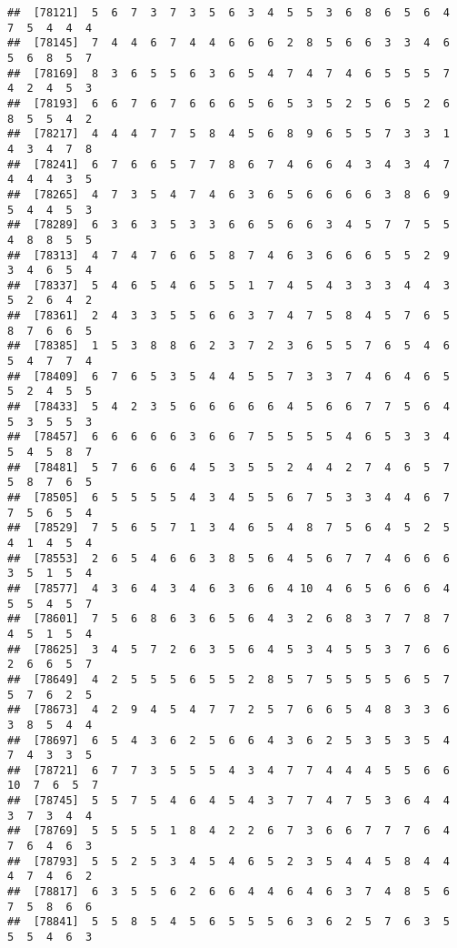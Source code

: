 \documentclass[
]{book}
\begin{document}
\begin{verbatim}
##  [78121]  5  6  7  3  7  3  5  6  3  4  5  5  3  6  8  6  5  6  4  7  5  4  4  4
##  [78145]  7  4  4  6  7  4  4  6  6  6  2  8  5  6  6  3  3  4  6  5  6  8  5  7
##  [78169]  8  3  6  5  5  6  3  6  5  4  7  4  7  4  6  5  5  5  7  4  2  4  5  3
##  [78193]  6  6  7  6  7  6  6  6  5  6  5  3  5  2  5  6  5  2  6  8  5  5  4  2
##  [78217]  4  4  4  7  7  5  8  4  5  6  8  9  6  5  5  7  3  3  1  4  3  4  7  8
##  [78241]  6  7  6  6  5  7  7  8  6  7  4  6  6  4  3  4  3  4  7  4  4  4  3  5
##  [78265]  4  7  3  5  4  7  4  6  3  6  5  6  6  6  6  3  8  6  9  5  4  4  5  3
##  [78289]  6  3  6  3  5  3  3  6  6  5  6  6  3  4  5  7  7  5  5  4  8  8  5  5
##  [78313]  4  7  4  7  6  6  5  8  7  4  6  3  6  6  6  5  5  2  9  3  4  6  5  4
##  [78337]  5  4  6  5  4  6  5  5  1  7  4  5  4  3  3  3  4  4  3  5  2  6  4  2
##  [78361]  2  4  3  3  5  5  6  6  3  7  4  7  5  8  4  5  7  6  5  8  7  6  6  5
##  [78385]  1  5  3  8  8  6  2  3  7  2  3  6  5  5  7  6  5  4  6  5  4  7  7  4
##  [78409]  6  7  6  5  3  5  4  4  5  5  7  3  3  7  4  6  4  6  5  5  2  4  5  5
##  [78433]  5  4  2  3  5  6  6  6  6  6  4  5  6  6  7  7  5  6  4  5  3  5  5  3
##  [78457]  6  6  6  6  6  3  6  6  7  5  5  5  5  4  6  5  3  3  4  5  4  5  8  7
##  [78481]  5  7  6  6  6  4  5  3  5  5  2  4  4  2  7  4  6  5  7  5  8  7  6  5
##  [78505]  6  5  5  5  5  4  3  4  5  5  6  7  5  3  3  4  4  6  7  7  5  6  5  4
##  [78529]  7  5  6  5  7  1  3  4  6  5  4  8  7  5  6  4  5  2  5  4  1  4  5  4
##  [78553]  2  6  5  4  6  6  3  8  5  6  4  5  6  7  7  4  6  6  6  3  5  1  5  4
##  [78577]  4  3  6  4  3  4  6  3  6  6  4 10  4  6  5  6  6  6  4  5  5  4  5  7
##  [78601]  7  5  6  8  6  3  6  5  6  4  3  2  6  8  3  7  7  8  7  4  5  1  5  4
##  [78625]  3  4  5  7  2  6  3  5  6  4  5  3  4  5  5  3  7  6  6  2  6  6  5  7
##  [78649]  4  2  5  5  5  6  5  5  2  8  5  7  5  5  5  5  6  5  7  5  7  6  2  5
##  [78673]  4  2  9  4  5  4  7  7  2  5  7  6  6  5  4  8  3  3  6  3  8  5  4  4
##  [78697]  6  5  4  3  6  2  5  6  6  4  3  6  2  5  3  5  3  5  4  7  4  3  3  5
##  [78721]  6  7  7  3  5  5  5  4  3  4  7  7  4  4  4  5  5  6  6 10  7  6  5  7
##  [78745]  5  5  7  5  4  6  4  5  4  3  7  7  4  7  5  3  6  4  4  3  7  3  4  4
##  [78769]  5  5  5  5  1  8  4  2  2  6  7  3  6  6  7  7  7  6  4  7  6  4  6  3
##  [78793]  5  5  2  5  3  4  5  4  6  5  2  3  5  4  4  5  8  4  4  4  7  4  6  2
##  [78817]  6  3  5  5  6  2  6  6  4  4  6  4  6  3  7  4  8  5  6  7  5  8  6  6
##  [78841]  5  5  8  5  4  5  6  5  5  5  6  3  6  2  5  7  6  3  5  5  5  4  6  3

\end{verbatim}
\end{document}
